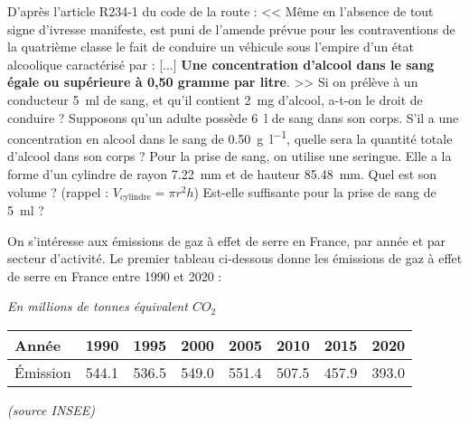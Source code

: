 \documentclass[../Cours.tex]{subfiles}
\begin{document}
\begin{questions}
    D'après l'article R234-1 du code de la route : <<  Même en l'absence de tout signe d'ivresse manifeste, est puni de l'amende prévue pour les contraventions de la quatrième classe le fait de conduire un véhicule sous l'empire d'un état alcoolique caractérisé par : [...] \textbf{Une concentration d'alcool dans le sang égale ou supérieure à 0,50 gramme par litre}. >> 
    \question Si on prélève à un conducteur \qty{5}{\milli\litre} de sang, et qu'il contient \qty{2}{\milli\gram} d'alcool, a-t-on le droit de conduire ?
    \question Supposons qu'un adulte possède \qty{6}{\litre} de sang dans son corps. S'il a une concentration en alcool dans le sang de \qty{0.50}{\gram\per\litre}, quelle sera la quantité totale d'alcool dans son corps ?
    \question Pour la prise de sang, on utilise une seringue. Elle a la forme d'un cylindre de rayon \qty{7.22}{\milli\metre} et de hauteur \qty{85.48}{\milli\metre}. 
    \subquestion Quel est son volume ? (rappel : $V_{\mbox{cylindre}} = \pi r^2 h$)
    \subquestion Est-elle suffisante pour la prise de sang de \qty{5}{\milli\litre} ?

    \clearpage
    On s'intéresse aux émissions de gaz à effet de serre en France, par année et par secteur d'activité. Le premier tableau ci-dessous donne les émissions de gaz à effet de serre en France entre 1990 et 2020 :
    \begin{center}
        \begin{flushright}
            \textit{En millions de tonnes équivalent $CO_2$}
        \end{flushright}
        \begin{tabularx}{0.8\linewidth}{|l|X|X|X|X|X|X|X|}\hline
            Année & 1990 & 1995 & 2000 & 2005 & 2010 & 2015 & 2020  \\\hline
            Émission & \num{544.1} & \num{536.5} & \num{549.0} & \num{551.4} & \num{507.5} & \num{457.9} & \num{393.0} \\\hline
        \end{tabularx}
        \begin{flushright}\vspace{-0.8em}
            \textit{(source INSEE)}
        \end{flushright}
    \end{center}


\end{questions}
\end{document}
